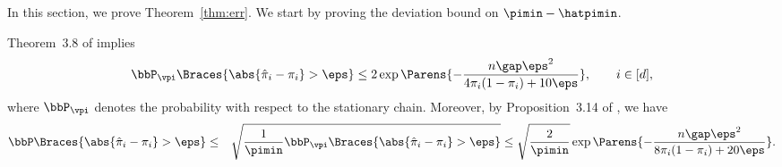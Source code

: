 

In this section, we prove Theorem~\ref{thm:err}.
We start by proving the deviation bound on $\pimin-\hatpimin$.


Theorem~3.8 of \citet{paulin15} implies
\[
\bbP_{\vpi}
\Braces{
\abs{ \hat\pi_i-\pi_i} > \eps
} \le
2\exp\Parens{-\frac{
    n\gap\eps^2
  }{
4\pi_i(1-\pi_i)+10\eps
}},
\qquad i\in[d],
\]
where $\bbP_{\vpi}$ denotes the probability with respect to the stationary chain.
Moreover, by Proposition~3.14 of \citet{paulin15}, we have
\begin{eqnarray*}
\bbP
\Braces{
\abs{ \hat\pi_i-\pi_i} > \eps
}
&\le&
\sqrt{
\frac1\pimin
\bbP_{\vpi}
\Braces{
\abs{ \hat\pi_i-\pi_i} > \eps
}} 
\le
\sqrt{\frac2\pimin}\exp\Parens{-\frac{
    n\gap\eps^2
  }{
8\pi_i(1-\pi_i)+20\eps
}}.
\end{eqnarray*}


